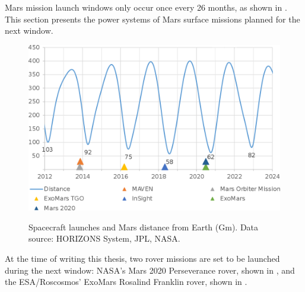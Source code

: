 Mars mission launch windows only occur once every 26 months, as shown in . This section presents the power systems of Mars surface missions planned for the next window.

\begin{figure}[h]
  \captionsetup[subfigure]{justification=centering}
  \centering
  \hypersetup{linkcolor=captionTextColor}
  \includegraphics[width=0.5\linewidth]{sections/state-of-the-art/planned-missions/plots/mars-distance-from-earth.png}\\
  \caption[Spacecraft launches and Mars distance from Earth]
          {Spacecraft launches and Mars distance from Earth (Gm). Data source: HORIZONS System, JPL, NASA.}
  \label{fig:mars-distance-from-earth}
\end{figure}

At the time of writing this thesis, two rover missions are set to be launched during the next window: \ac{NASA}'s Mars 2020 Perseverance rover, shown in , and the \ac{ESA}/Roscosmos' ExoMars Rosalind Franklin rover, shown in .

\vspace{0.5cm}

